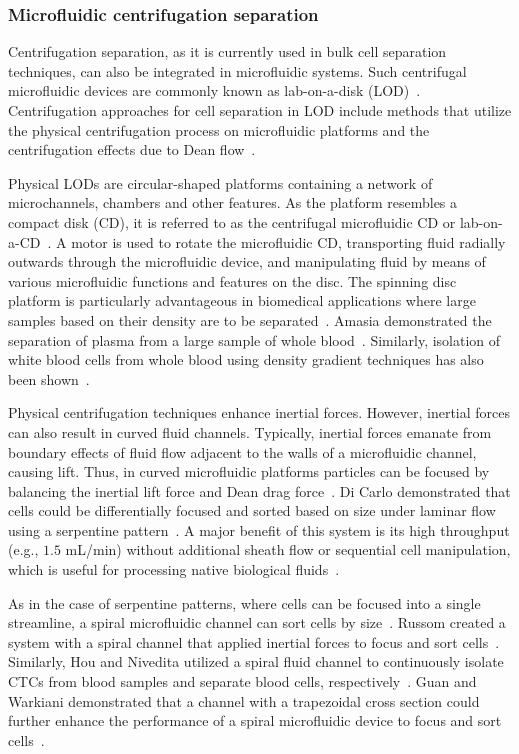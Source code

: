 \subsubsection{Microfluidic centrifugation separation}
Centrifugation separation, as it is currently used in bulk cell separation techniques, can also be integrated in microfluidic systems. Such centrifugal microfluidic devices are commonly known as lab-on-a-disk (LOD)~\cite{Lai2004,Park2012,Kim2014}. Centrifugation approaches for cell separation in LOD include methods that utilize the physical centrifugation process on microfluidic platforms and the centrifugation effects due to Dean flow~\cite{Dean1959}.

Physical LODs are circular-shaped platforms containing a network of microchannels, chambers and other features. As the platform resembles a compact disk (CD), it is referred to as the centrifugal microfluidic CD or lab-on-a-CD~\cite{Gorkin2010}. A motor is used to rotate the microfluidic CD, transporting fluid radially outwards through the microfluidic device, and manipulating fluid by means of various microfluidic functions and features on the disc. The spinning disc platform is particularly advantageous in biomedical applications where large samples based on their density are to be separated~\cite{Burger2012,Burger2012a}. Amasia \etal{} demonstrated the separation of plasma from a large sample of whole blood~\cite{Amasia2010}. Similarly, isolation of white blood cells from whole blood using density gradient techniques has also been shown~\cite{Kinahan2014,Nwankire2015}.

Physical centrifugation techniques enhance inertial forces. However, inertial forces can also result in curved fluid channels. Typically, inertial forces emanate from boundary effects of fluid flow adjacent to the walls of a microfluidic channel, causing lift. Thus, in curved microfluidic platforms particles can be focused by balancing the inertial lift force and Dean drag force~\cite{DiCarlo2009}. Di Carlo \etal{} demonstrated that cells could be differentially focused and sorted based on size under laminar flow using a serpentine pattern~\cite{DiCarlo2007}. A major benefit of this system is its high throughput (e.g., $1.5$ mL/min) without additional sheath flow or sequential cell manipulation, which is useful for processing native biological fluids~\cite{DiCarlo2008}.

As in the case of serpentine patterns, where cells can be focused into a single streamline, a spiral microfluidic channel can sort cells by size~\cite{Kuntaegowdanahalli2009}. Russom \etal{} created a system with a spiral channel that applied inertial forces to focus and sort cells~\cite{Russom2009}. Similarly, Hou \etal{} and Nivedita \etal{} utilized a spiral fluid channel to continuously isolate CTCs from blood samples and separate blood cells, respectively~\cite{Hou2013,Nivedita2013}. Guan \etal{} and Warkiani \etal{} demonstrated that a channel with a trapezoidal cross section could further enhance the performance of a spiral microfluidic device to focus and sort cells~\cite{Guan2013,Warkiani2014}.

